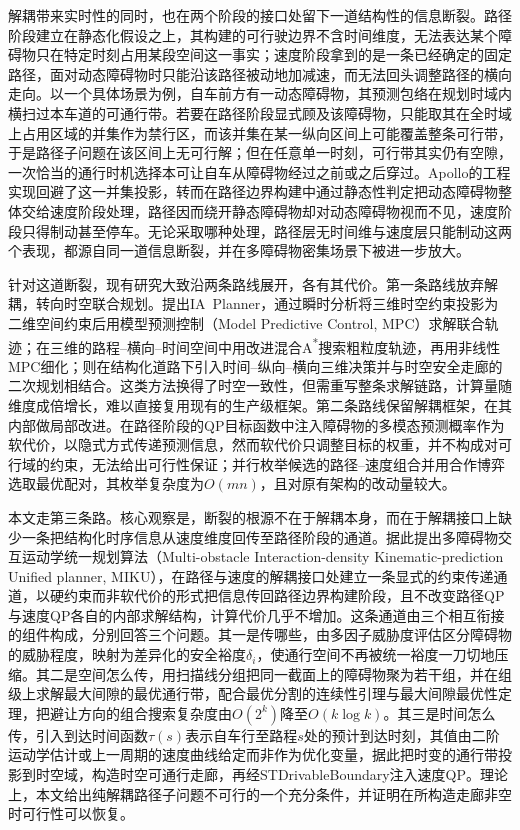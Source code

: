 \documentclass[a4paper,11pt]{ctexart}
\theoremstyle{definition}
\begin{document}
解耦带来实时性的同时，也在两个阶段的接口处留下一道结构性的信息断裂。路径阶段建立在静态化假设之上，其构建的可行驶边界不含时间维度，无法表达某个障碍物只在特定时刻占用某段空间这一事实；速度阶段拿到的是一条已经确定的固定路径，面对动态障碍物时只能沿该路径被动地加减速，而无法回头调整路径的横向走向。以一个具体场景为例，自车前方有一动态障碍物，其预测包络在规划时域内横扫过本车道的可通行带。若要在路径阶段显式顾及该障碍物，只能取其在全时域上占用区域的并集作为禁行区，而该并集在某一纵向区间上可能覆盖整条可行带，于是路径子问题在该区间上无可行解；但在任意单一时刻，可行带其实仍有空隙，一次恰当的通行时机选择本可让自车从障碍物经过之前或之后穿过。Apollo的工程实现回避了这一并集投影，转而在路径边界构建中通过静态性判定把动态障碍物整体交给速度阶段处理，路径因而绕开静态障碍物却对动态障碍物视而不见，速度阶段只得制动甚至停车。无论采取哪种处理，路径层无时间维与速度层只能制动这两个表现，都源自同一道信息断裂，并在多障碍物密集场景下被进一步放大\citep{gonzalez2016}。

针对这道断裂，现有研究大致沿两条路线展开，各有其代价。第一条路线放弃解耦，转向时空联合规划。\citet{yang2021_ia_planner}提出IA~Planner，通过瞬时分析将三维时空约束投影为二维空间约束后用模型预测控制（Model Predictive Control, MPC）求解联合轨迹；\citet{hu2023_hybrid_astar_slt}在三维的路程--横向--时间空间中用改进混合A\textsuperscript{*}搜索粗粒度轨迹，再用非线性MPC细化；\citet{qiao2025stjoint}则在结构化道路下引入时间--纵向--横向三维决策并与时空安全走廊的二次规划相结合。这类方法换得了时空一致性，但需重写整条求解链路，计算量随维度成倍增长，难以直接复用现有的生产级框架。第二条路线保留解耦框架，在其内部做局部改进。\citet{han2026_contingency}在路径阶段的QP目标函数中注入障碍物的多模态预测概率作为软代价，以隐式方式传递预测信息，然而软代价只调整目标的权重，并不构成对可行域的约束，无法给出可行性保证；\citet{zhang2023_dp_rcg}并行枚举候选的路径--速度组合并用合作博弈选取最优配对，其枚举复杂度为$O(mn)$，且对原有架构的改动量较大。

本文走第三条路。核心观察是，断裂的根源不在于解耦本身，而在于解耦接口上缺少一条把结构化时序信息从速度维度回传至路径阶段的通道。据此提出多障碍物交互运动学统一规划算法（Multi-obstacle Interaction-density Kinematic-prediction Unified planner, MIKU），在路径与速度的解耦接口处建立一条显式的约束传递通道，以硬约束而非软代价的形式把信息传回路径边界构建阶段，且不改变路径QP与速度QP各自的内部求解结构，计算代价几乎不增加。这条通道由三个相互衔接的组件构成，分别回答三个问题。其一是传哪些，由多因子威胁度评估区分障碍物的威胁程度，映射为差异化的安全裕度$\delta_i$，使通行空间不再被统一裕度一刀切地压缩。其二是空间怎么传，用扫描线分组把同一截面上的障碍物聚为若干组，并在组级上求解最大间隙的最优通行带，配合最优分割的连续性引理与最大间隙最优性定理，把避让方向的组合搜索复杂度由$O(2^k)$降至$O(k\log k)$。其三是时间怎么传，引入到达时间函数$\tau(s)$表示自车行至路程$s$处的预计到达时刻，其值由二阶运动学估计或上一周期的速度曲线给定而非作为优化变量，据此把时变的通行带投影到时空域，构造时空可通行走廊，再经STDrivableBoundary注入速度QP。理论上，本文给出纯解耦路径子问题不可行的一个充分条件，并证明在所构造走廊非空时可行性可以恢复。
\end{document}
